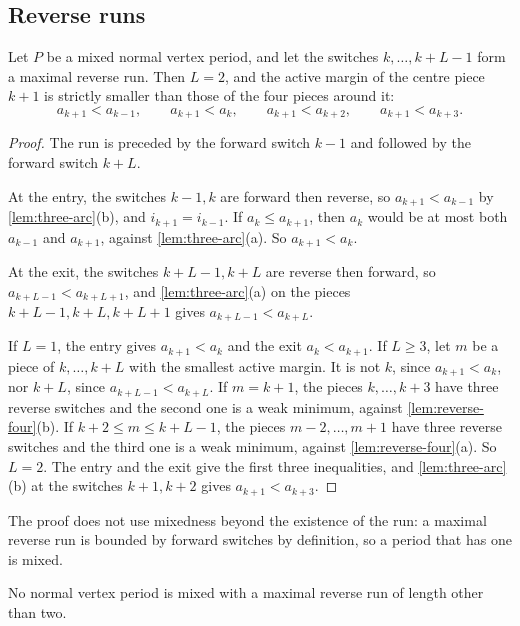 \subsection{Reverse runs}\label{sec:rev-runs}

\begin{proposition}\label{prop:run-structure}
Let $P$ be a mixed normal vertex period, and let the switches $k,\dots,k+L-1$ form a maximal
reverse run. Then $L=2$, and the active margin of the centre piece $k+1$ is strictly smaller
than those of the four pieces around it:
\[
  a_{k+1}<a_{k-1},\qquad a_{k+1}<a_k,\qquad a_{k+1}<a_{k+2},\qquad a_{k+1}<a_{k+3}.
\]
\end{proposition}

\begin{proof}
The run is preceded by the forward switch $k-1$ and followed by the forward switch $k+L$.

At the entry, the switches $k-1,k$ are forward then reverse, so $a_{k+1}<a_{k-1}$ by
\cref{lem:three-arc}(b), and $i_{k+1}=i_{k-1}$. If $a_k\le a_{k+1}$, then $a_k$ would be at most
both $a_{k-1}$ and $a_{k+1}$, against \cref{lem:three-arc}(a). So $a_{k+1}<a_k$.

At the exit, the switches $k+L-1,k+L$ are reverse then forward, so $a_{k+L-1}<a_{k+L+1}$, and
\cref{lem:three-arc}(a) on the pieces $k+L-1,k+L,k+L+1$ gives $a_{k+L-1}<a_{k+L}$.

If $L=1$, the entry gives $a_{k+1}<a_k$ and the exit $a_k<a_{k+1}$. If $L\ge3$, let $m$ be a
piece of $k,\dots,k+L$ with the smallest active margin. It is not $k$, since $a_{k+1}<a_k$, nor
$k+L$, since $a_{k+L-1}<a_{k+L}$. If $m=k+1$, the pieces $k,\dots,k+3$ have three reverse switches
and the second one is a weak minimum, against \cref{lem:reverse-four}(b). If
$k+2\le m\le k+L-1$, the pieces $m-2,\dots,m+1$ have three reverse switches and the third one is a
weak minimum, against \cref{lem:reverse-four}(a). So $L=2$. The entry and the exit give the first
three inequalities, and \cref{lem:three-arc}(b) at the switches $k+1,k+2$ gives
$a_{k+1}<a_{k+3}$.
\end{proof}

The proof does not use mixedness beyond the existence of the run: a maximal reverse run is
bounded by forward switches by definition, so a period that has one is mixed.

\begin{theorem}\label{thm:class-M3}
No normal vertex period is mixed with a maximal reverse run of length other than two.
\end{theorem}

